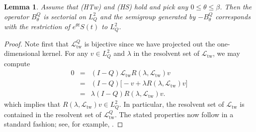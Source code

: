 \documentclass[10pt]{articleHJ}
\newtheorem{lem}[thm]{Lemma}
\numberwithin{equation}{section}
\begin{document}
\begin{lem}
\label{lem:nls:b:q:theta:sect}
Assume that (HTw) and (HS) hold
and pick any $0 \le \theta \le \beta$.
Then
the operator $B^Q_{\theta}$
is sectorial on $L^2_Q$ and the semigroup
generated by $-B^Q_{\theta}$ corresponds
with the restriction of $e^{\theta t} S(t)$
to $L^2_Q$.
\end{lem}
\begin{proof}
Note first that $\mathcal{L}_{\mathrm{tw}}^Q$ is bijective
since we have projected out the one-dimensional kernel.
For any $v \in L^2_Q$ and $\lambda$
in the resolvent set of $\mathcal{L}_{\mathrm{tw}}$,
we may compute
\begin{equation}
\begin{array}{lcl}
0 & = & (I - Q) \mathcal{L}_{\mathrm{tw}} R(\lambda, \mathcal{L}_{\mathrm{tw}}) v
\\[0.2cm]
 & = & (I-Q) \big[ -v + \lambda R(\lambda, \mathcal{L}_{\mathrm{tw}}) v \big]
\\[0.2cm]
 & = & \lambda (I - Q) R(\lambda, \mathcal{L}_{\mathrm{tw}}) v.
\end{array}
\end{equation}
which implies that
$R(\lambda, \mathcal{L}_{\mathrm{tw}}) v \in L^2_Q$.
In particular, the resolvent set of $\mathcal{L}_{\mathrm{tw}}$
is contained in the resolvent set of $\mathcal{L}_{\mathrm{tw}}^Q$.
The stated properties now follow in a standard fashion;
see, for example, \cite[Prop 3.1.5]{lorenzi2004analytic}.
\end{proof}
\end{document}
